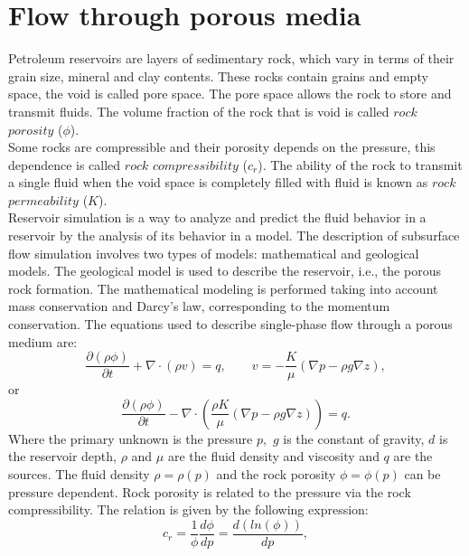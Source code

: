 \documentclass[12pt]{article}
\begin{document}
 
 \newpage
\section{Flow through porous media}\label{fpm}
\hspace{0.5cm}
Petroleum reservoirs are layers of sedimentary rock, which vary in terms of their grain size, mineral
and clay contents. 
These rocks contain grains and empty space, the void is called pore space.
The pore space allows the rock to 
store and transmit fluids. The volume fraction of the rock that is void is called $rock$
$porosity$ ($\phi$).\\
Some rocks are compressible and their porosity depends on the pressure, this dependence is called 
$rock$ $compressibility$ ($c_r$). 
The ability of the rock to transmit a single fluid when the void space is completely filled with fluid
is known as $rock$ $permeability$ (${K}$). \\
Reservoir simulation is a way to analyze and predict the fluid behavior in a reservoir
by the analysis of its behavior in a model. The description of subsurface flow simulation involves two types of models: 
mathematical and geological models. The geological model is used to describe the reservoir, i.e., the porous rock formation. 
The mathematical modeling is performed taking into account mass conservation and Darcy's law,
corresponding to the momentum conservation. The equations used to describe single-phase flow through a porous medium are:
\begin{equation}\label{eq:ce}
\frac{\partial (\rho \phi)}{\partial t}+ \nabla \cdot ( \rho {v})=q, \qquad v=-\frac{K}{\mu}(\nabla p-\rho g\nabla z),
\end{equation}
or
\begin{equation}\label{eq:ce1}
\frac{\partial (\rho \phi)}{\partial t}- \nabla \cdot \left( \frac{\rho{K}}{\mu}(\nabla {p}-\rho g\nabla z)\right)=q.
\end{equation}
Where the primary unknown is the pressure ${p},$ $g$ is the constant of gravity, $d$ is the reservoir depth,
$\rho$ and $\mu$ are the fluid density and viscosity and $q$ are the sources. The fluid density $\rho=\rho(p)$ and the rock porosity $\phi=\phi(p)$ can be pressure dependent.
Rock porosity is related to the pressure via the rock compressibility. The relation is given by the following expression:
\begin{equation*}
 c_r=\frac{1}{\phi}\frac{d\phi}{dp}=\frac{d(ln(\phi))}{dp},
\end{equation*}
\end{document}
